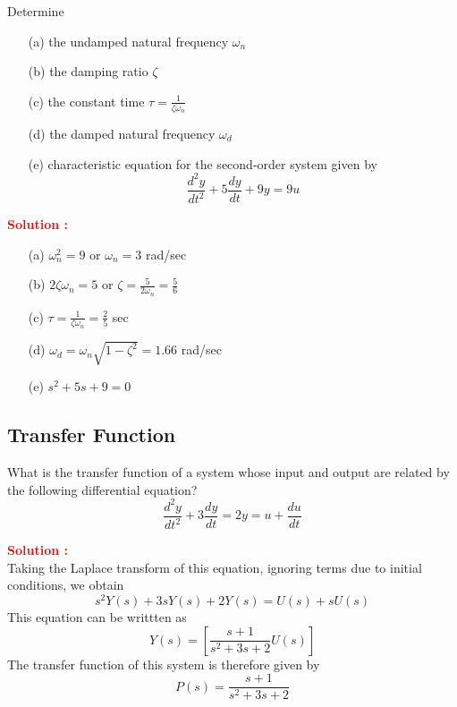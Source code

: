 \documentclass[12pt]{article}
\begin{document}
Determine
\begin{itemize}
    \item[(a)] the undamped natural frequency \(\omega_n\)
    \item[(b)] the damping ratio \(\zeta\)
    \item[(c)] the constant time \(\tau = \frac{1}{\zeta \omega_n}\)
    \item[(d)] the damped natural frequency \(\omega_d\)
    \item[(e)] characteristic equation for the second-order system given by
    \begin{equation}
        \frac{d^2y}{dt^2} + 5 \frac{dy}{dt} + 9 y = 9u
    \end{equation}
\end{itemize}

\textbf{\textcolor{red}{Solution :}} \\
\begin{itemize}
    \item[(a)] \(\omega_n^2 = 9\) or \(\omega_n = 3\) rad/sec
    \item[(b)] \(2\zeta \omega_n = 5\) or \(\zeta = \frac{5}{2\omega_n} = \frac{5}{6}\)
    \item[(c)] \(\tau = \frac{1}{\zeta \omega_n} = \frac{2}{5}\) sec
    \item[(d)] \(\omega_d = \omega_n \sqrt{1-\zeta^2} = 1.66\) rad/sec
    \item[(e)] \(s^2+5s+9 = 0\)
\end{itemize}

\clearpage
\subsection{Transfer Function}

What is the transfer function of a system whose input and output are related by the following differential equation?
\begin{equation}
    \frac{d^2y}{dt^2} + 3\frac{dy}{dt} = 2y = u + \frac{du}{dt}
\end{equation}

\textbf{\textcolor{red}{Solution :}} \\
Taking the Laplace transform of this equation, ignoring terms due to initial conditions, we obtain
\begin{equation}
    s^2 Y(s) + 3sY(s) + 2Y(s) = U(s) + s U(s)
\end{equation}
This equation can be writtten as 
\begin{equation}
    Y(s) = \left[ \frac{s+1}{s^2+3s+2} U(s) \right]
\end{equation}
The transfer function of this system is therefore given by
\begin{equation}
    P(s) = \frac{s+1}{s^2+3s+2}
\end{equation}
\end{document}

